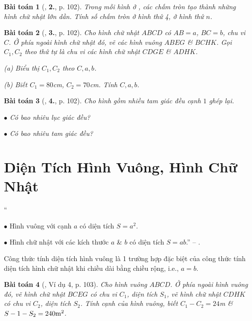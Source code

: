 \documentclass{article}
\numberwithin{equation}{section}
\newtheorem{baitoan}{Bài toán}[section]
\begin{document}
\begin{baitoan}[\cite{Binh_Toan_6_tap_1}, \textbf{2.}, p. 102]
	Trong mỗi hình ở \cite[Hình 21, p. 101]{Binh_Toan_6_tap_1}, các chấm tròn tạo thành những hình chữ nhật lớn dần. Tính số chấm tròn ở hình thứ 4, ở hình thứ $n$.
\end{baitoan}

\begin{baitoan}[\cite{Binh_Toan_6_tap_1}, \textbf{3.}, p. 102]
	Cho hình chữ nhật $ABCD$ có $AB = a$, $BC = b$, chu vi $C$. Ở phía ngoài hình chữ nhật đó, vẽ các hình vuông $ABEG$ \& $BCHK$. Gọi $C_1,C_2$ theo thứ tự là chu vi các hình chữ nhật $CDGE$ \& $ADHK$.
	\begin{enumerate*}
		\item[(a)] Biểu thị $C_1,C_2$ theo $C,a,b$.
		\item[(b)] Biết $C_1 = 80$\emph{cm}, $C_2 = 70$\emph{cm}. Tính $C,a,b$.
	\end{enumerate*}
\end{baitoan}

\begin{baitoan}[\cite{Binh_Toan_6_tap_1}, \textbf{4.}, p. 102]
	Cho hình \cite[Hình 22, p. 101]{Binh_Toan_6_tap_1} gồm nhiều tam giác đều cạnh $1$ ghép lại.
	\begin{enumerate*}
		\item[$\bullet$] Có bao nhiêu lục giác đều?
		\item[$\bullet$] Có bao nhiêu tam giác đều?
	\end{enumerate*}
\end{baitoan}


\section{Diện Tích Hình Vuông, Hình Chữ Nhật}
``\begin{enumerate*}
	\item[$\bullet$] Hình vuông với cạnh $a$ có diện tích $S = a^2$.
	\item[$\bullet$] Hình chữ nhật với các kích thước $a$ \& $b$ có diện tích $S = ab$.'' -- \cite[p. 102]{Binh_Toan_6_tap_1}.
\end{enumerate*}
Công thức tính diện tích hình vuông là 1 trường hợp đặc biệt của công thức tính diện tích hình chữ nhật khi chiều dài bằng chiều rộng, i.e., $a = b$.

\begin{baitoan}[\cite{Binh_Toan_6_tap_1}, Ví dụ 4, p. 103]
	Cho hình vuông $ABCD$. Ở phía ngoài hình vuông đó, vẽ hình chữ nhật $BCEG$ có chu vi $C_1$, diện tích $S_1$, vẽ hình chữ nhật $CDHK$ có chu vi $C_2$, diện tích $S_2$. Tính cạnh của hình vuông, biết $C_1 - C_2 = 24$\emph{m} \& $S-1 - S_2 = 240{\rm m}^2$.
\end{baitoan}
\end{document}

